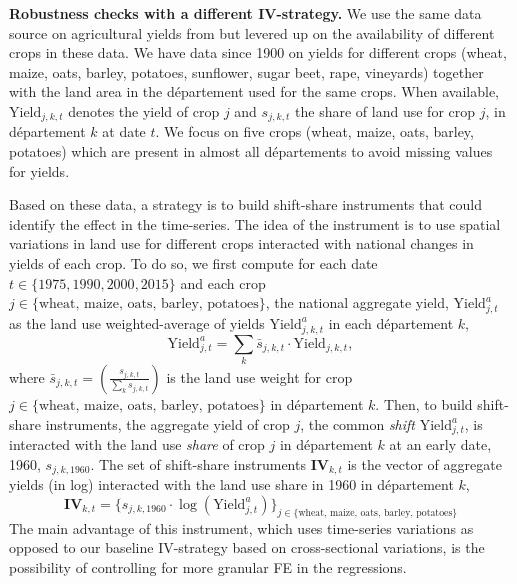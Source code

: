 \documentclass[11pt]{report}
\begin{document}
\noindent \textbf{Robustness checks with a different IV-strategy.} We use the same data source on agricultural yields from \cite{schaubergeretal2022} but levered up on the availability of different crops in these data. We have data since 1900 on yields for different crops (wheat, maize, oats, barley, potatoes, sunflower, sugar beet, rape, vineyards) together with the land area in the département used for the same crops. When available, $\text{Yield}_{j,k,t}$ denotes the yield of crop $j$ and $s_{j,k,t}$ the share of land use for crop $j$, in département $k$ at date $t$. We focus on five crops (wheat, maize, oats, barley, potatoes) which are present in almost all départements to avoid missing values for yields. 

Based on these data, a strategy is to build shift-share instruments that could identify the effect in the time-series. The idea of the instrument is to use spatial variations in land use for different crops interacted with national changes in yields of each crop. To do so, we first compute for each date $t\in \{1975, 1990, 2000, 2015\}$ and each crop $j \in \{\text{wheat, maize, oats, barley, potatoes}\}$, the national aggregate yield, $\text{Yield}^a_{j,t}$ as the land use weighted-average of yields $\text{Yield}^a_{j,k,t}$ in each département $k$,
\begin{equation*} 
\text{Yield}^a_{j,t}=\sum_{k}  \bar{s}_{j,k,t} \cdot  \text{Yield}_{j,k,t},
\end{equation*}
where $\bar{s}_{j,k,t}=\left( \frac{s_{j,k,t}}{\sum_{k}s_{j,k, t}}\right)$ is the land use weight for crop $j \in \{\text{wheat, maize, oats, barley, potatoes}\}$ in département $k$. Then, to build shift-share instruments, the aggregate yield of crop $j$, the common \textit{shift} $\text{Yield}^a_{j,t}$, is interacted with the land use \textit{share} of crop $j$ in département $k$ at an early date, 1960, $s_{j,k, 1960}$. The set of shift-share instruments $\mathbf{IV}_{k,t}$ is the vector of aggregate yields (in log) interacted with the land use share in 1960 in département $k$,
\begin{equation} 
\mathbf{IV}_{k,t}=\{s_{j,k, 1960} \cdot \log (\text{Yield}^a_{j,t})\}_{j \in \{\text{wheat, maize, oats, barley, potatoes}\}} \label{A-reg:shiftshareIV}
\end{equation}
The main advantage of this instrument, which uses time-series variations as opposed to our baseline IV-strategy based on cross-sectional variations, is the possibility of controlling for more granular FE in the regressions. 
\end{document}

